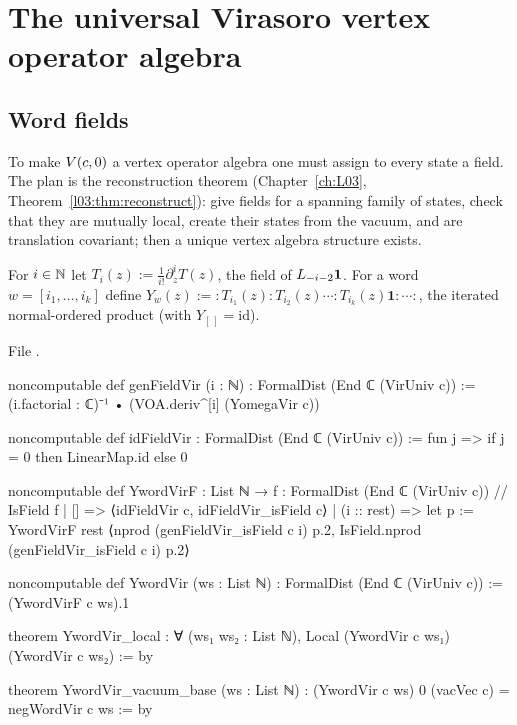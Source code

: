 \section{The universal Virasoro vertex operator algebra}\label{l06:sec:voa}

\subsection{Word fields}

To make $V(c,0)$ a vertex operator algebra one must assign to every state a field. The plan is the
reconstruction theorem (Chapter~\ref{ch:L03}, Theorem~\ref{l03:thm:reconstruct}):
give fields for a spanning family of states, check that they are mutually local, create their states
from the vacuum, and are translation covariant; then a unique vertex algebra structure exists.

\begin{definition}\label{l06:def:wordfields}
For $i\in{\mathbb{N}}$ let $T_i(z) := \frac{1}{i!}\partial_z^iT(z)$, the field of $L_{-i-2}\mathbf{1}$. For a word
$w = [i_1,\dots,i_k]$ define $Y_w(z) := {:}T_{i_1}(z){:}T_{i_2}(z)\cdots{:}T_{i_k}(z)\mathbf{1}{:}\cdots{:}$, the
iterated normal-ordered product (with $Y_{[\,]} = \mathrm{id}$).
\end{definition}

File .
\begin{leancode}
noncomputable def genFieldVir (i : ℕ) : FormalDist (End ℂ (VirUniv c)) :=
  (i.factorial : ℂ)⁻¹ • (VOA.deriv^[i] (YomegaVir c))

noncomputable def idFieldVir : FormalDist (End ℂ (VirUniv c)) :=
  fun j => if j = 0 then LinearMap.id else 0

noncomputable def YwordVirF :
    List ℕ → { f : FormalDist (End ℂ (VirUniv c)) // IsField f }
  | [] => ⟨idFieldVir c, idFieldVir_isField c⟩
  | (i :: rest) =>
      let p := YwordVirF rest
      ⟨nprod (genFieldVir_isField c i) p.2, IsField.nprod (genFieldVir_isField c i) p.2⟩

noncomputable def YwordVir (ws : List ℕ) : FormalDist (End ℂ (VirUniv c)) := (YwordVirF c ws).1

theorem YwordVir_local : ∀ (ws₁ ws₂ : List ℕ), Local (YwordVir c ws₁) (YwordVir c ws₂) := by

theorem YwordVir_vacuum_base (ws : List ℕ) :
    (YwordVir c ws) 0 (vacVec c) = negWordVir c ws := by
\end{leancode}

